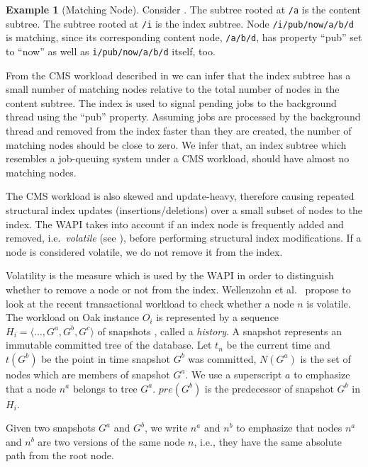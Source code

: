 \documentclass[abstracton,12pt]{scrartcl}
\theoremstyle{definition}
\newtheorem{example}{Example}
\begin{document}
\begin{example}[Matching Node]
  Consider . The subtree rooted at \texttt{/a} is
  the content subtree. The subtree rooted at \texttt{/i} is the index
  subtree. Node \texttt{/i/pub/now/a/b/d} is matching, since its corresponding
  content node, \texttt{/a/b/d}, has property ``pub'' set to ``now'' as well as
  \texttt{i/pub/now/a/b/d} itself, too.
\end{example}

From the CMS workload described in  we can 
infer that the index subtree has a small number of
matching nodes relative to the total number of nodes in the content subtree. The index is
 used to signal pending jobs to the background thread using
the ``pub'' property. Assuming jobs are processed by
the background thread and removed from the index faster than they are created,
the number of matching nodes should be close to zero. We infer that, an index subtree
which resembles a job-queuing system under a CMS workload, should have
almost no matching nodes. 

The CMS workload is also skewed and update-heavy, therefore causing repeated structural index
updates (insertions/deletions) over a small subset of nodes to the index.
The WAPI takes into account if an index node is frequently added and removed,
i.e.\ \textit{volatile} (see ), before performing structural
index modifications. If a node is considered volatile, we do not remove it from the index.

Volatility is the measure which is used by the WAPI in order to distinguish
whether to remove a node or not from the index.
Wellenzohn et al.~\cite{KW17} propose to look at the recent transactional
workload to check whether a node $n$ is volatile. The workload on Oak instance
$O_i$ is represented by a sequence $H_i = \langle \ldots, G^a, G^b, G^c
\rangle$ of snapshots \cite{Hainaut2009}, called a \textit{history}. 
A snapshot represents an immutable
committed tree of the database. Let $t_n$ be the current time and
$t(G^b)$ be the point in time snapshot $G^b$ was committed, $N(G^a)$ is the
set of nodes which are members of snapshot $G^a$. We use a superscript $a$
to emphasize that a node $n^a$ belongs to tree $G^a$. $pre(G^b)$ is the
predecessor of snapshot $G^b$ in $H_i$.

Given two snapshots $G^a$ and $G^b$, we write $n^a$ and $n^b$ to emphasize that
nodes $n^a$ and $n^b$ are two versions of the same node $n$, i.e., they have
the same absolute path from the root node.
\end{document}
